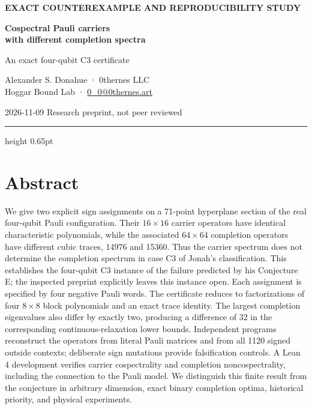 \documentclass[11pt,letterpaper]{article}
\begin{document}
\thispagestyle{empty}
{\small\bfseries\color{Accent}EXACT COUNTEREXAMPLE AND REPRODUCIBILITY STUDY}\par
\vspace{0.6em}
{\fontsize{22}{25}\selectfont\bfseries Cospectral Pauli carriers\\with different completion spectra}\par
\vspace{0.25em}
{\large\color{Accent}An exact four-qubit C3 certificate}\par
\vspace{0.8em}
{\normalsize Alexander S. Donahue · 0thernes LLC\\{\small\color{Muted}Hoggar Bound Lab · \href{mailto:0_0@0thernes.art}{0\_0@0thernes.art}}}\par
{\small\color{Muted}2026-11-09 \quad\textbullet\quad Research preprint, not peer reviewed}\par
\vspace{0.6em}
{\color{Accent}\hrule height 0.65pt}
\vspace{0.5em}
\section{Abstract}\label{abstract}

We give two explicit sign assignments on a 71-point hyperplane section of the real four-qubit Pauli configuration. Their \(16\times16\) carrier operators have identical characteristic polynomials, while the associated \(64\times64\) completion operators have different cubic traces, 14976 and 15360. Thus the carrier spectrum does not determine the completion spectrum in case C3 of Jonah's classification. This establishes the four-qubit C3 instance of the failure predicted by his Conjecture E; the inspected preprint explicitly leaves this instance open. Each assignment is specified by four negative Pauli words. The certificate reduces to factorizations of four \(8\times8\) block polynomials and an exact trace identity. The largest completion eigenvalues also differ by exactly two, producing a difference of 32 in the corresponding continuous-relaxation lower bounds. Independent programs reconstruct the operators from literal Pauli matrices and from all 1120 signed outside contexts; deliberate sign mutations provide falsification controls. A Lean 4 development verifies carrier cospectrality and completion noncospectrality, including the connection to the Pauli model. We distinguish this finite result from the conjecture in arbitrary dimension, exact binary completion optima, historical priority, and physical experiments.
\end{document}
